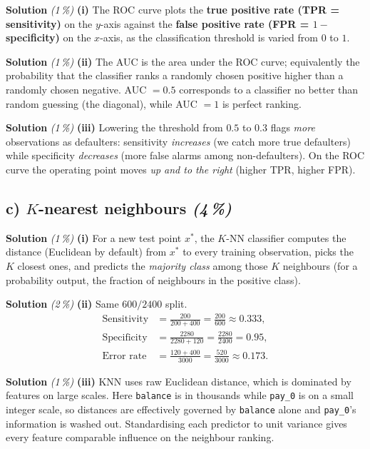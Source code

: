 \documentclass[11pt,a4paper]{article}
\newcommand{\subpoints}[1]{\textit{(#1\,\%)}}
\newcommand{\sol}{\noindent\textbf{Solution}}
\begin{document}
\sol{} \subpoints{1} \textbf{(i)} The ROC curve plots the
\textbf{true positive rate (TPR = sensitivity)} on the $y$-axis against the
\textbf{false positive rate (FPR = $1-$specificity)} on the $x$-axis, as the classification
threshold is varied from $0$ to $1$.

\medskip
\sol{} \subpoints{1} \textbf{(ii)} The AUC is the area under the ROC curve; equivalently the
probability that the classifier ranks a randomly chosen positive higher than a randomly chosen
negative. AUC $=0.5$ corresponds to a classifier no better than random guessing (the diagonal),
while AUC $=1$ is perfect ranking.

\medskip
\sol{} \subpoints{1} \textbf{(iii)} Lowering the threshold from $0.5$ to $0.3$ flags
\emph{more} observations as defaulters: sensitivity \emph{increases} (we catch more true
defaulters) while specificity \emph{decreases} (more false alarms among non-defaulters).
On the ROC curve the operating point moves \emph{up and to the right} (higher TPR, higher FPR).

\subsection*{c) $K$-nearest neighbours \subpoints{4}}

\sol{} \subpoints{1} \textbf{(i)} For a new test point $x^*$, the $K$-NN classifier computes the
distance (Euclidean by default) from $x^*$ to every training observation, picks the $K$ closest
ones, and predicts the \emph{majority class} among those $K$ neighbours (for a probability output,
the fraction of neighbours in the positive class).

\medskip
\sol{} \subpoints{2} \textbf{(ii)} Same $600/2400$ split.
\begin{align*}
\text{Sensitivity} &= \frac{200}{200+400} = \frac{200}{600} \approx \boxed{0.333}, \\
\text{Specificity} &= \frac{2280}{2280+120} = \frac{2280}{2400} = \boxed{0.95}, \\
\text{Error rate} &= \frac{120+400}{3000} = \frac{520}{3000} \approx \boxed{0.173}.
\end{align*}

\medskip
\sol{} \subpoints{1} \textbf{(iii)} KNN uses raw Euclidean distance, which is dominated by features
on large scales. Here \texttt{balance} is in thousands while \texttt{pay\_0} is on a small integer
scale, so distances are effectively governed by \texttt{balance} alone and \texttt{pay\_0}'s
information is washed out. Standardising each predictor to unit variance gives every feature
comparable influence on the neighbour ranking.
\end{document}
